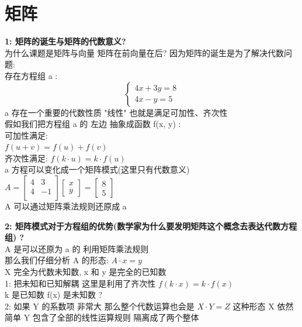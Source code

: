 \documentclass[12pt]{article}
\begin{document}
\section{矩阵}
\begin{flushleft}

    \vspace{0.5em}
    \noindent\textbf{1: 矩阵的诞生与矩阵的代数意义?} \\
    为什么课题是矩阵与向量 矩阵在前向量在后? 因为矩阵的诞生是为了解决代数问题: \\
    存在方程组 a :\\
    \[
        \begin{cases}
            4x + 3y = 8 \\
            4x - y  = 5
        \end{cases}
    \]
    a 存在一个重要的代数性质 "线性" 也就是满足可加性、齐次性 \\
    假如我们把方程组 a 的 左边 抽象成函数 f(x, y) : \\
    可加性满足: \\
    $f(u+v) = f(u) + f(v)$ \\
    齐次性满足:
    $f(k \cdot u) = k \cdot f(u)$ \\

    a 方程可以变化成一个矩阵模式(这里只有代数意义) \\
    $ A =  \begin{bmatrix}
            4 & 3  \\
            4 & -1 \\
        \end{bmatrix} \begin{bmatrix}
            x \\
            y
        \end{bmatrix} = \begin{bmatrix}
            8 \\
            5
        \end{bmatrix}$ \\
    A 可以通过矩阵乘法规则还原成 a

    \vspace{0.5em}
    \noindent\textbf{2: 矩阵模式对于方程组的优势(数学家为什么要发明矩阵这个概念去表达代数方程组) ? } \\

    A 是可以还原为 a 的 利用矩阵乘法规则 \\
    那么我们仔细分析 A 的形态:
    $ A\cdot x  = y$ \\
    X 完全为代数未知数, x 和 y 是完全的已知数 \\
    1: 把未知和已知解耦 这里是利用了齐次性 $f(k \cdot x) = k \cdot f(x)$ \\ k 是已知数 f(x) 是未知数 ? \\
    2: 如果 Y 的系数项 非常大 那么整个代数运算也会是 $X \cdot Y  = Z$  这种形态 X 依然简单 Y 包含了全部的线性运算规则 隔离成了两个整体 \\


\end{flushleft}
\end{document}
